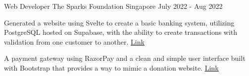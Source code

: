 \begin{cventries}
    
    \cventry
    {Web Developer} %
    {The Sparks Foundation} %
    {Singapore} %
    {July 2022 - Aug 2022} %
    {
      \begin{cvitems} %
        \item {Generated a website using Svelte to create a basic banking system, utilizing PostgreSQL hosted on Supabase, with the ability to create transactions with validation from one customer to another. \textcolor{link}{\underline{\href{https://tsf-intern.vercel.app/}{Link}}}}
        \item {A payment gateway using RazorPay and a clean and simple user interface built with Bootstrap that provides a way to mimic a donation website. \textcolor{link}{\underline{\href{https://tsf-intern2.vercel.app}{Link}}}}
      \end{cvitems}
    }
    
   

    
   
\end{cventries}
